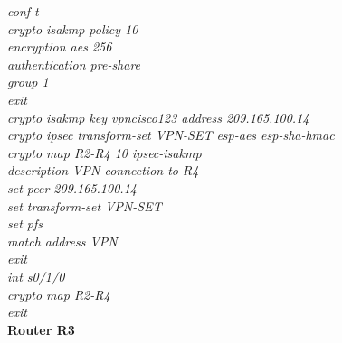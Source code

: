 \documentclass[a4paper, 12pt]{article}
\begin{document}
\hspace*{2cm}\textit{conf t \\
\hspace*{2cm}crypto isakmp policy 10\\
\hspace*{2cm}encryption aes 256\\
\hspace*{2cm}authentication pre-share\\
\hspace*{2cm}group 1\\
\hspace*{2cm}exit\\
\hspace*{2cm}crypto isakmp key vpncisco123 address 209.165.100.14\\
\hspace*{2cm}crypto ipsec transform-set VPN-SET esp-aes esp-sha-hmac\\
\hspace*{2cm}crypto map R2-R4 10 ipsec-isakmp\\
\hspace*{2cm}description VPN connection to R4\\
\hspace*{2cm}set peer 209.165.100.14\\
\hspace*{2cm}set transform-set VPN-SET\\
\hspace*{2cm}set pfs\\
\hspace*{2cm}match address VPN\\
\hspace*{2cm}exit \\
\hspace*{2cm}int s0/1/0\\
\hspace*{2cm}crypto map R2-R4\\
\hspace*{2cm}exit\\}
\hspace*{1cm}\textbf{Router R3}	\\
\end{document}
